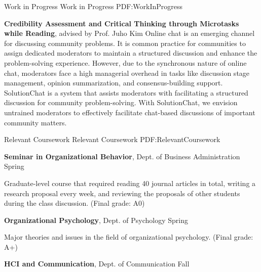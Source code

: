 \documentclass[letterpaper,MMMyyyy,nonstopmode]{template}
\begin{document}
\begin{Body}
\endgroup

\BigGap
\SubSection
{Work in Progress}
{Work in Progress}
{PDF:WorkInProgress}

\begingroup
\renewcommand{\MaxNumberedItem}{[88]}

\BigGap
\NumberedItem{[5]}
  \textbf{Credibility Assessment and Critical Thinking through Microtasks while Reading}, advised by Prof. Juho Kim
  \vspace{2mm}\newline
  {\small{
    Online chat is an emerging channel for discussing community problems. It is common practice for communities to assign dedicated moderators to maintain a structured discussion and enhance the problem-solving experience. However, due to the synchronous nature of online chat, moderators face a high managerial overhead in tasks like discussion stage management, opinion summarization, and consensus-building support. SolutionChat is a system that assists moderators with facilitating a structured discussion for community problem-solving.
    With SolutionChat, we envision untrained moderators to effectively facilitate chat-based discussions of important community matters.
  }}

\endgroup


\BigGap
\Section
{Relevant Coursework}
{Relevant Coursework}
{PDF:RelevantCoursework}

\Entry
  \textbf{Seminar in Organizational Behavior},
  Dept. of Business Administration
  \hfill
   Spring

  \begin{Detail}
  \SubBulletItem
    Graduate-level course that required reading 40 journal articles in total, writing a research proposal every week, and reviewing the proposals of other students during the class discussion. (Final grade: A0)
  \end{Detail}

\BigGap
\Entry
  \textbf{Organizational Psychology},
  Dept. of Psychology
  \hfill
   Spring

  \begin{Detail}
  \SubBulletItem
    Major theories and issues in the field of organizational psychology. (Final grade: A+)
  \end{Detail}

\BigGap
\Entry
  \textbf{HCI and Communication},
  Dept. of Communication
  \hfill
   Fall


\end{Body}
\end{document}
